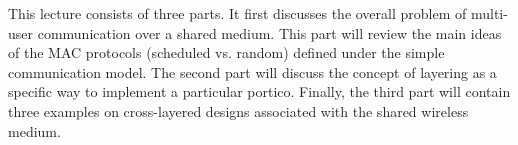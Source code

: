 This lecture consists of three parts. It first discusses the overall problem of multi-user communication over a shared medium. This part will review the main ideas of the MAC protocols (scheduled vs. random) defined under the simple communication model. The second part will discuss the concept of layering as a specific way to implement a particular portico. Finally, the third part will contain three examples on cross-layered designs associated with the shared wireless medium.
